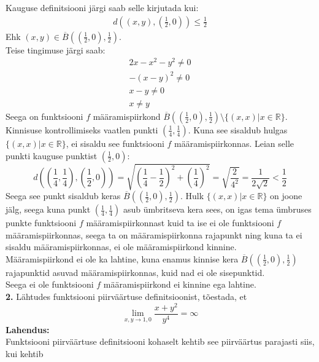 \documentclass{article}
\begin{document}
Kauguse definitsiooni järgi saab selle kirjutada kui:
\begin{gather*}
d\left((x,y),\left(\frac{1}{2},0\right)\right)\leq\frac{1}{2}
\end{gather*}
Ehk $(x,y)\in\overline{B}\left(\left(\frac{1}{2},0\right),\frac{1}{2}\right)$.\\
Teise tingimuse järgi saab:
\begin{gather*}
2x-x^2-y^2\neq0\\
-(x-y)^2\neq0\\
x-y\neq0\\
x\neq y
\end{gather*}
Seega on funktsiooni $f$ määramispiirkond $\overline{B}\left(\left(\frac{1}{2},0\right),\frac{1}{2}\right)\setminus\{(x,x)|x\in\mathbb{R}\}$.\\
Kinnisuse kontrollimiseks vaatlen punkti $\left(\frac{1}{4},\frac{1}{4}\right)$. Kuna see sisaldub hulgas $\{(x,x)|x\in\mathbb{R}\}$, ei sisaldu see funktsiooni $f$ määramispiirkonnas. Leian selle punkti kauguse punktist $\left(\frac{1}{2},0\right)$:
\begin{equation*}
d\left(\left(\frac{1}{4},\frac{1}{4}\right),\left(\frac{1}{2},0\right)\right)=\sqrt{\left(\frac{1}{4}-\frac{1}{2}\right)^2+\left(\frac{1}{4}\right)^2}=\sqrt{\frac{2}{4^2}}=\frac{1}{2\sqrt{2}}<\frac{1}{2}
\end{equation*}
Seega see punkt sisaldub keras $\overline{B}\left(\left(\frac{1}{2},0\right),\frac{1}{2}\right)$. Hulk $\{(x,x)|x\in\mathbb{R}\}$ on joone jälg, seega kuna punkt $\left(\frac{1}{4},\frac{1}{4}\right)$ asub ümbritseva kera sees, on igas tema ümbruses punkte funktsiooni $f$ määramispiirkonnast kuid ta ise ei ole funktsiooni $f$ määramispiirkonnas, seega ta on määramispiirkonna rajapunkt ning kuna ta ei sisaldu määramispiirkonnas, ei ole määramispiirkond kinnine.\\
Määramispiirkond ei ole ka lahtine, kuna enamus kinnise kera $\overline{B}\left(\left(\frac{1}{2},0\right),\frac{1}{2}\right)$ rajapunktid asuvad määramispiirkonnas, kuid nad ei ole sisepunktid.\\
Seega ei ole funktsiooni $f$ määramispiirkond ei kinnine ega lahtine.\pagebreak\\
\textbf{2. }Lähtudes funktsiooni piirväärtuse definitsioonist, tõestada, et
\begin{equation*}
\lim_{x,y\to1,0}\frac{x+y^2}{y^4}=\infty
\end{equation*}
\textbf{Lahendus:}\\
Funktsiooni piirväärtuse definitsiooni kohaselt kehtib see piirväärtus parajasti siis, kui kehtib
\end{document}

